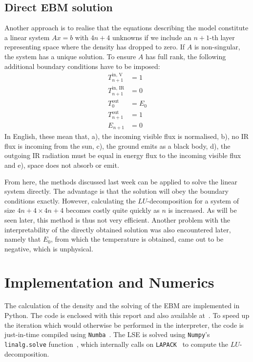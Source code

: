 \documentclass[a4paper,DIV=12,english]{scrartcl}
\begin{document}
\subsection{Direct EBM solution}
Another approach is to realise that the equations describing the model constitute a linear system $Ax = b$ with $4n + 4$ unknowns if we include an $n+1$-th layer representing space where the density has dropped to zero. If $A$ is non-singular, the system has a unique solution. To ensure $A$ has full rank, the following additional boundary conditions have to be imposed:
\begin{align}
    T_{n+1}^{\text{in, V}} &= 1 \nonumber \\
    T_{n+1}^{\text{in, IR}} &= 0 \nonumber \\
    T_{0}^{\text{out}} &= E_0 \\
    T_{n+1}^{\text{out}} &= 1 \nonumber \\
    E_{n+1} &= 0 \nonumber
\end{align}
In English, these mean that, a), the incoming visible flux is normalised, b), no IR flux is incoming from the sun, c), the ground emits as a black body, d), the outgoing IR radiation must be equal in energy flux to the incoming visible flux and e), space does not absorb or emit.

From here, the methods discussed last week can be applied to solve the linear system directly. The advantage is that the solution will obey the boundary conditions exactly. However, calculating the $LU$-decomposition for a system of size $4n+4 \times 4n+4$ becomes costly quite quickly as $n$ is increased. As will be seen later, this method is thus not very efficient. Another problem with the interpretability of the directly obtained solution was also encountered later, namely that $E_0$, from which the temperature is obtained, came out to be negative, which is unphysical.

\section{Implementation and Numerics}
The calculation of the density and the solving of the EBM are implemented in Python. The code is enclosed with this report and also available at~\cite{github}. To speed up the iteration which would otherwise be performed in the interpreter, the code is just-in-time compiled using \texttt{Numba}~\cite{numba}. The LSE is solved using \texttt{Numpy}'s \texttt{linalg.solve} function~\cite{harris2020array}, which internally calls on \texttt{LAPACK}~\cite{laug} to compute the $LU$-decomposition.
\end{document}
